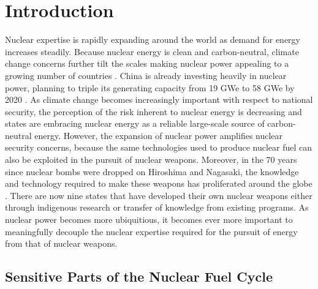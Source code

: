 \section{Introduction}
\label{s_motive}

Nuclear expertise is rapidly expanding around the world as demand for energy increases steadily. Because nuclear energy is clean and carbon-neutral, climate change concerns further tilt the scales making nuclear power appealing to a growing number of countries \cite{mooney_why_2014}.  China is already investing heavily in nuclear power, planning to triple its generating capacity from 19 \gls{GWe} to 58 \gls{GWe} by 2020 \cite{_china_2014}.  As climate change becomes increasingly important with respect to national security, the perception of the risk inherent to nuclear energy is decreasing and states are embracing nuclear energy as a reliable large-scale source of carbon-neutral energy.  However, the expansion of nuclear power amplifies nuclear security concerns, because the same technologies used to produce nuclear fuel can also be exploited in the pursuit of nuclear weapons.  Moreover, in the 70 years since nuclear bombs were dropped on Hiroshima and Nagasaki, the knowledge and technology required to make these weapons has proliferated around the globe \cite{feiveson_unmaking_2014}. There are now nine states that have developed their own nuclear weapons either through indigenous research or transfer of knowledge from existing programs. As nuclear power becomes more ubiquitious, it becomes ever more important to meaningfully decouple the nuclear expertise required for the pursuit of energy from that of nuclear weapons.  

\subsection{Sensitive Parts of the Nuclear Fuel Cycle}

